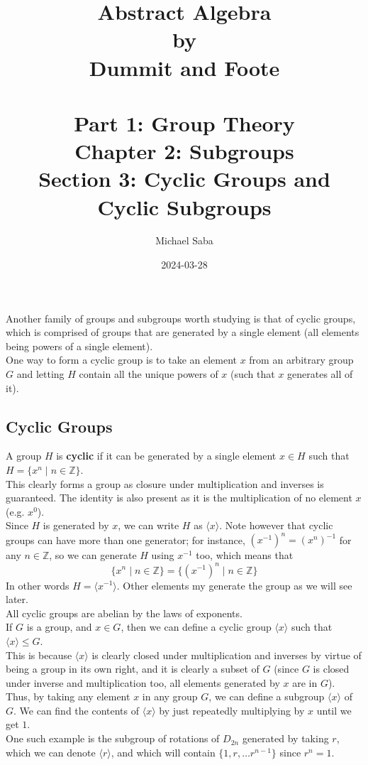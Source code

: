 \documentclass[12pt]{article}
\title{%
    \Huge Abstract Algebra \\
    \large by \\
    \Large Dummit and Foote \\~\\
    \huge Part 1: Group Theory \\
    \LARGE Chapter 2: Subgroups \\
    \Large Section 3: Cyclic Groups and Cyclic Subgroups
}
\date{2024-03-28}
\author{Michael Saba}
\newcommand{\Z}{\mathbb{Z}}
\newcommand{\ang}[1]{\langle #1 \rangle}
\begin{document}
    \maketitle
    \newpage

   
    Another family of groups and subgroups worth studying
    is that of cyclic groups,
    which is comprised of groups that are generated
    by a single element
    (all elements being powers of a single element). \\
    One way to form a cyclic group is to take an element $x$
    from an arbitrary group $G$
    and letting $H$ contain all the unique powers of $x$
    (such that $x$ generates all of it). \\


    \subsection*{Cyclic Groups}

    A group $H$ is \textbf{cyclic}
    if it can be generated by a single element 
    $x \in H$ such that $H = \{ x^n \mid n \in \Z \}$. \\
    This clearly forms a group as closure under multiplication
    and inverses is guaranteed.
    The identity is also present as it is the multiplication of
    no element $x$ (e.g. $x^0$). \\
    Since $H$ is generated by $x$,
    we can write $H$ as $\ang{x}$.
    Note however that cyclic groups can have more than one generator;
    for instance, $(x^{-1})^n = (x^n)^{-1}$ for any $n \in \Z$,
    so we can generate $H$ using $x^{-1}$ too,
    which means that
    \[ \{ x^n \mid n \in \Z \} = \{ (x^{-1})^n \mid n \in \Z \} \]
    In other words $H = \ang{x^{-1}}$.
    Other elements my generate the group as we will see later. \\

    All cyclic groups are abelian by the laws of exponents. \\

    If $G$ is a group, and $x \in G$,
    then we can define a cyclic group $\ang{x}$
    such that $\ang{x} \leqslant G$. \\
    This is because $\ang{x}$ is clearly closed under
    multiplication and inverses
    by virtue of being a group in its own right,
    and it is clearly a subset of $G$
    (since $G$ is closed under inverse and multiplication too,
    all elements generated by $x$ are in $G$). \\
    Thus, by taking any element $x$ in any group $G$,
    we can define a subgroup $\ang{x}$ of $G$.
    We can find the contents of $\ang{x}$
    by just repeatedly multiplying by $x$ until we get $1$. \\
    One such example is the subgroup of rotations of $D_{2n}$
    generated by taking $r$,
    which we can denote $\ang{r}$,
    and which will contain
    $\{1, r, \dots r^{n-1}\}$ since $r^n = 1$. \\
\end{document}

